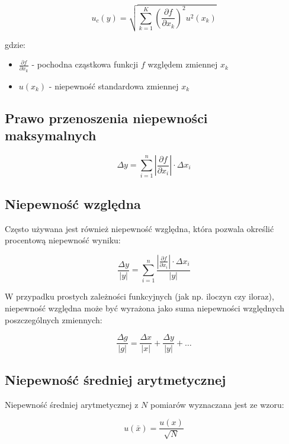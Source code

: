 \documentclass[a4paper,12pt]{article}
\begin{document}
\begin{equation}
    u_c(y) = \sqrt{\sum_{k=1}^{K} \left( \frac{\partial f}{\partial x_k} \right)^2 u^2(x_k)}
\end{equation}

gdzie:
\begin{itemize}
    \item $\frac{\partial f}{\partial x_k}$ - pochodna cząstkowa funkcji $f$ względem zmiennej $x_k$
    \item $u(x_k)$ - niepewność standardowa zmiennej $x_k$
\end{itemize}

\subsection{Prawo przenoszenia niepewności maksymalnych}

\begin{equation}
    \Delta y = \sum_{i=1}^{n} \left | \frac{\partial f}{\partial x_i} \right | \cdot \Delta x_i
\end{equation}

\subsection{Niepewność względna}
Często używana jest również niepewność względna, która pozwala określić procentową niepewność wyniku:

\begin{equation}
    \frac{\Delta y}{|y|} = \sum_{i=1}^{n} \frac{\left | \frac{\partial f}{\partial x_i} \right | \cdot \Delta x_i}{|y|}
\end{equation}

W przypadku prostych zależności funkcyjnych (jak np. iloczyn czy iloraz), niepewność względna może być wyrażona jako suma niepewności względnych poszczególnych zmiennych:

\begin{equation}
    \frac{\Delta g}{|g|} = \frac{\Delta x}{|x|} + \frac{\Delta y}{|y|} + \ldots
\end{equation}

\subsection{Niepewność średniej arytmetycznej}
Niepewność średniej arytmetycznej z $N$ pomiarów wyznaczana jest ze wzoru:

\begin{equation}
    u(\bar{x}) = \frac{u(x)}{\sqrt{N}}
\end{equation}
\end{document}
